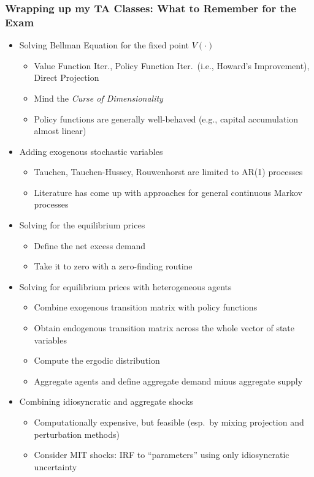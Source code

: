 \documentclass[10pt, aspectratio=1610, natbib, handout]{beamer}
\begin{document}
  \begin{frame}
    \frametitle{Wrapping up my TA Classes: What to Remember for the Exam}

    \begin{itemize}
      \item Solving Bellman Equation for the fixed point $V(\cdot)$
        \begin{itemize}
          \item Value Function Iter., Policy Function Iter.~(i.e., Howard's Improvement), Direct Projection
          \item Mind the \textit{Curse of Dimensionality}
          \item Policy functions are generally well-behaved (e.g., capital accumulation almost linear)
        \end{itemize}
      \vfill\pause
      \item Adding exogenous stochastic variables
        \begin{itemize}
          \item Tauchen, Tauchen-Hussey, Rouwenhorst are limited to AR(1) processes
          \item Literature has come up with approaches for general continuous Markov processes
        \end{itemize}
      \vfill\pause
      \item Solving for the equilibrium prices
        \begin{itemize}
          \item Define the net excess demand
          \item Take it to zero with a zero-finding routine
        \end{itemize}
      \vfill\pause
      \item Solving for equilibrium prices with heterogeneous agents
        \begin{itemize}
          \item Combine exogenous transition matrix with policy functions
          \item Obtain endogenous transition matrix across the whole vector of state variables
          \item Compute the ergodic distribution
          \item Aggregate agents and define aggregate demand minus aggregate supply
        \end{itemize}
      \vfill\pause
      \item Combining idiosyncratic and aggregate shocks
        \begin{itemize}
          \item Computationally expensive, but feasible (esp.~by mixing projection and perturbation methods)
          \item Consider MIT shocks: IRF to ``parameters'' using only idiosyncratic uncertainty
        \end{itemize}
    \end{itemize}

  \end{frame}
\end{document}
